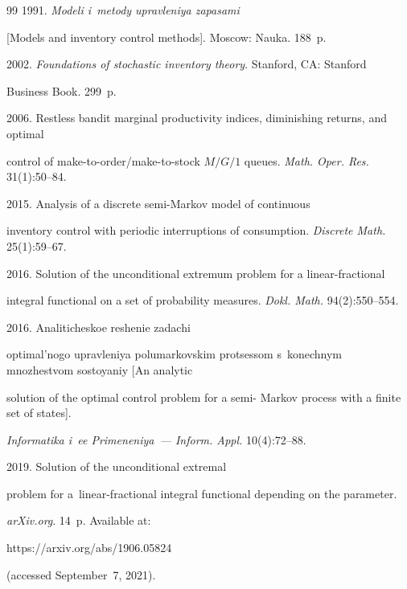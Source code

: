 {{\begin{thebibliography}{99}
 1991. \textit{Modeli i~metody upravleniya zapasami} 

[Models and inventory control methods]. Moscow: Nauka. 188~p.


 2002. \textit{Foundations of stochastic inventory theory}. Stanford, CA: Stanford 

Business Book. 299~p.


 2006. Restless bandit marginal productivity indices, diminishing returns, and optimal 

control of make-to-order/make-to-stock $M/G/1$ queues. \textit{Math. Oper. Res.} 31(1):50--84.


 2015. Analysis of a discrete semi-Markov model of continuous 

inventory control with periodic interruptions of consumption. \textit{Discrete Math.} 25(1):59--67.


 2016. Solution of the unconditional extremum problem for a linear-fractional 

integral functional on a set of probability measures. \textit{Dokl. Math.} 94(2):550--554.


 2016. Analiticheskoe reshenie zadachi 

optimal'nogo upravleniya polumarkovskim protsessom s~konechnym mno\-zhe\-st\-vom sostoyaniy [An analytic 

solution of the optimal control problem for a semi- Markov process with a finite set of states]. 

\textit{Informatika i~ee Primeneniya~--- Inform. Appl.} 10(4):72--88.

 


 2019. Solution of the unconditional extremal 

problem for a~linear-fractional integral functional depending on the parameter. 

\textit{arXiv.org}. 14~p. Available at: {\sf 

https://arxiv.org/abs/1906.05824} (accessed September~7, 2021).




\end{thebibliography}}}
